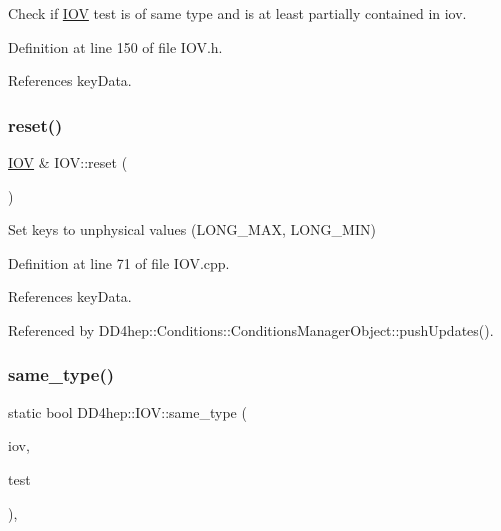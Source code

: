 Check if \hyperlink{class_d_d4hep_1_1_i_o_v}{I\+OV} \textquotesingle{}test\textquotesingle{} is of same type and is at least partially contained in iov. 



Definition at line 150 of file I\+O\+V.\+h.



References key\+Data.

\hypertarget{class_d_d4hep_1_1_i_o_v_acbc1f282468528fd38d471bf7f9d58c0}{}\label{class_d_d4hep_1_1_i_o_v_acbc1f282468528fd38d471bf7f9d58c0} 
\subsubsection{\texorpdfstring{reset()}{reset()}}
{\footnotesize\ttfamily \hyperlink{class_d_d4hep_1_1_i_o_v}{I\+OV} \& I\+O\+V\+::reset (\begin{DoxyParamCaption}{ }\end{DoxyParamCaption})}



Set keys to unphysical values (L\+O\+N\+G\+\_\+\+M\+AX, L\+O\+N\+G\+\_\+\+M\+IN) 



Definition at line 71 of file I\+O\+V.\+cpp.



References key\+Data.



Referenced by D\+D4hep\+::\+Conditions\+::\+Conditions\+Manager\+Object\+::push\+Updates().

\hypertarget{class_d_d4hep_1_1_i_o_v_a25febeab024c770e5846197ca2a6b6fa}{}\label{class_d_d4hep_1_1_i_o_v_a25febeab024c770e5846197ca2a6b6fa} 
\subsubsection{\texorpdfstring{same\+\_\+type()}{same\_type()}}
{\footnotesize\ttfamily static bool D\+D4hep\+::\+I\+O\+V\+::same\+\_\+type (\begin{DoxyParamCaption}\item[{const \hyperlink{class_d_d4hep_1_1_i_o_v}{I\+OV} \&}]{iov,  }\item[{const \hyperlink{class_d_d4hep_1_1_i_o_v}{I\+OV} \&}]{test }\end{DoxyParamCaption})\hspace{0.3cm}{\ttfamily [inline]}, {\ttfamily [static]}}



